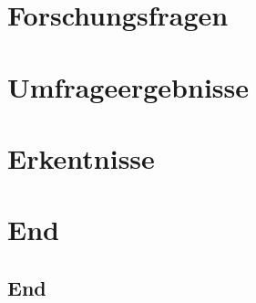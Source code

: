 \documentclass[hyperref={pdfpagelabels=false},usepdftitle=false]{beamer}
\begin{document}

\title{\titleText}
\subtitle{Pretest zur Umfrage \enquote{Textsetzung mathematischer Formeln} von Martin Thoma}
\author{\tutor}
\date{10. Januar 2015}

\frame{\titlepage}



\section{Forschungsfragen}


\section{Umfrageergebnisse}


\section{Erkentnisse}


\section*{End}
\subsection{End}

\end{document}
